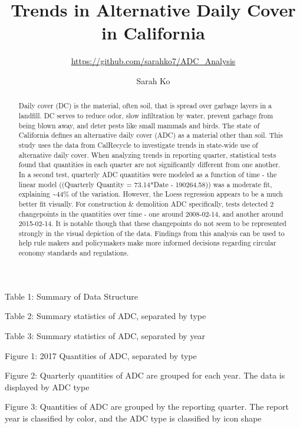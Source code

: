 \documentclass[12pt,]{article}
\title{Trends in Alternative Daily Cover in California}
\subtitle{\url{https://github.com/sarahko7/ADC_Analysis}}
\author{Sarah Ko}
\date{}
\begin{document}
\maketitle
\begin{abstract}
Daily cover (DC) is the material, often soil, that is spread over
garbage layers in a landfill. DC serves to reduce odor, slow
infiltration by water, prevent garbage from being blown away, and deter
pests like small mammals and birds. The state of California defines an
alternative daily cover (ADC) as a material other than soil. This study
uses the data from CalRecycle to investigate trends in state-wide use of
alternative daily cover. When analyzing trends in reporting quarter,
statistical tests found that quantities in each quarter are not
significantly different from one another. In a second test, quarterly
ADC quantities were modeled as a function of time - the linear model
((Quarterly Quantity = 73.14*Date - 190264.58)) was a moderate fit,
explaining \textasciitilde{}44\% of the variation. However, the Loess
regression appears to be a much better fit visually. For construction \&
demolition ADC specifically, tests detected 2 changepoints in the
quantities over time - one around 2008-02-14, and another around
2015-02-14. It is notable though that these changepoints do not seem to
be represented strongly in the visual depiction of the data. Findings
from this analysis can be used to help rule makers and policymakers make
more informed decisions regarding circular economy standards and
regulations.
\end{abstract}

\newpage

\tableofcontents 

\newpage

\newpage

\listoftables 

Table 1: Summary of Data Structure

Table 2: Summary statistics of ADC, separated by type

Table 3: Summary statistics of ADC, separated by year

\newpage

\listoffigures 

Figure 1: 2017 Quantities of ADC, separated by type

Figure 2: Quarterly quantities of ADC are grouped for each year. The
data is displayed by ADC type

Figure 3: Quantities of ADC are grouped by the reporting quarter. The
report year is classified by color, and the ADC type is classified by
icon shape
\end{document}
